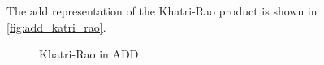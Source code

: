 The \gls{add} representation of the Khatri-Rao product is shown in \autoref{fig:add_katri_rao}.
\begin{figure*}
    \centering
    
    \caption{Khatri-Rao in ADD}
    \label{fig:add_katri_rao}
\end{figure*}


